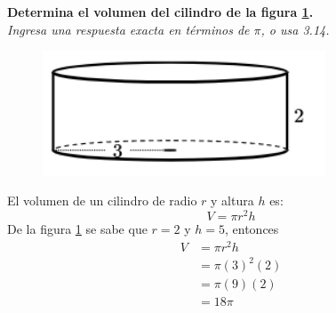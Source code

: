\question[10] \textbf{Determina el volumen del cilindro de la figura \ref{fig:vol_cil_06}.}\\
\textit{Ingresa una respuesta exacta en términos de $\pi$, o usa 3.14.}

\begin{minipage}{0.3\linewidth}
    \begin{figure}[H]
        \begin{center}
            \includegraphics[width=0.75\textwidth]{../images/vol_cil_06.png}
        \end{center}
        \caption{}
        \label{fig:vol_cil_06}
    \end{figure}
\end{minipage}
\begin{minipage}{0.7\linewidth}
    \begin{solutionbox}{6cm}        El volumen de un cilindro de radio $r$ y altura $h$ es:
        \begin{equation*}
            V = \pi r^2 h
        \end{equation*}
        De la figura \ref{fig:vol_cil_06} se sabe que $r=2$ y $h=5$, entonces
        \begin{equation*}
            \begin{split}
                V & = \pi r^2 h\\
                & = \pi (3)^2 (2)\\
                & = \pi (9) (2)\\
                & = 18\pi
            \end{split}
        \end{equation*}
    \end{solutionbox}
\end{minipage}